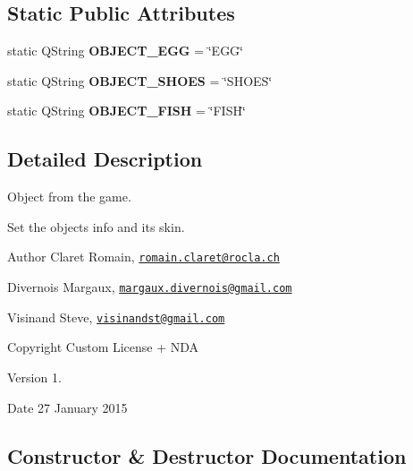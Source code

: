 \subsection*{Static Public Attributes}
\begin{DoxyCompactItemize}
\item 
\hypertarget{class_g___object_a344799eeecb55a83dff4a702a436fb11}{}static Q\+String {\bfseries O\+B\+J\+E\+C\+T\+\_\+\+E\+G\+G} = \char`\"{}E\+G\+G\char`\"{}\label{class_g___object_a344799eeecb55a83dff4a702a436fb11}

\item 
\hypertarget{class_g___object_a68157168b2f8d3a11f5c9b82c3cdb0ac}{}static Q\+String {\bfseries O\+B\+J\+E\+C\+T\+\_\+\+S\+H\+O\+E\+S} = \char`\"{}S\+H\+O\+E\+S\char`\"{}\label{class_g___object_a68157168b2f8d3a11f5c9b82c3cdb0ac}

\item 
\hypertarget{class_g___object_ab0fce0005ab160a146a72f62f4f17ac3}{}static Q\+String {\bfseries O\+B\+J\+E\+C\+T\+\_\+\+F\+I\+S\+H} = \char`\"{}F\+I\+S\+H\char`\"{}\label{class_g___object_ab0fce0005ab160a146a72f62f4f17ac3}

\end{DoxyCompactItemize}


\subsection{Detailed Description}
Object from the game. 

Set the object\textquotesingle{}s info and its skin. \begin{DoxyAuthor}{Author}
Claret Romain, \href{mailto:romain.claret@rocla.ch}{\tt romain.\+claret@rocla.\+ch} 

Divernois Margaux, \href{mailto:margaux.divernois@gmail.com}{\tt margaux.\+divernois@gmail.\+com} 

Visinand Steve, \href{mailto:visinandst@gmail.com}{\tt visinandst@gmail.\+com} 
\end{DoxyAuthor}
\begin{DoxyCopyright}{Copyright}
Custom License + N\+D\+A 
\end{DoxyCopyright}
\begin{DoxyVersion}{Version}
1. 
\end{DoxyVersion}
\begin{DoxyDate}{Date}
27 January 2015 
\end{DoxyDate}


\subsection{Constructor \& Destructor Documentation}
\hypertarget{class_g___object_aa64de9d24e8b67e33e537657030a813d}{}
